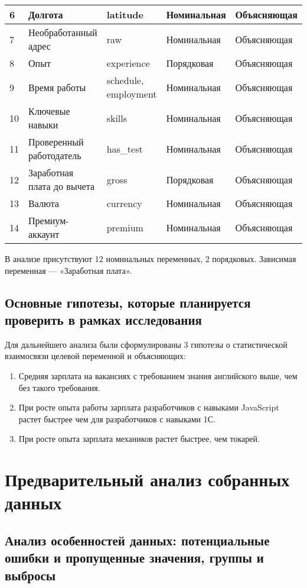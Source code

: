 \documentclass[12pt]{article}
\begin{document}
\begin{longtable}{|l|l|l|l|l|}
6 & Долгота & latitude  & Номинальная & Объясняющая\\ \hline
7 & Необработанный адрес & raw & Номинальная & Объясняющая\\ \hline
8 & Опыт & experience & Порядковая & Объясняющая\\ \hline
9 & Время работы & schedule, employment & Номинальная & Объясняющая\\ \hline
10 & Ключевые навыки & skills & Номинальная & Объясняющая\\ \hline
11 & Проверенный работодатель& has\_test & Номинальная & Объясняющая\\ \hline
12 & Заработная плата до вычета& gross & Порядковая & Объясняющая\\ \hline
13 & Валюта & currency & Номинальная & Объясняющая\\ \hline
14 & Премиум-аккаунт & premium & Номинальная & Объясняющая\\ \hline

\end{longtable}

В анализе присутствуют 12 номинальных переменных, 2 порядковых. Зависимая переменная --- «Заработная плата».
\subsection{Основные гипотезы, которые планируется проверить в рамках исследования}

Для дальнейшего анализа были сформулированы 3 гипотезы о статистической взаимосвязи целевой переменной и объясняющих:
\begin{enumerate}
\item Средняя зарплата на вакансиях с требованием знания английского выше, чем без такого требования. 
\item  При росте опыта работы зарплата разработчиков с навыками JavaScript растет быстрее чем для разработчиков с навыками 1С.
\item  При росте опыта зарплата механиков растет быстрее, чем токарей.
\end{enumerate}
\section{Предварительный анализ собранных данных}
\subsection{Анализ особенностей данных: потенциальные ошибки и пропущенные значения,
группы и выбросы}
\end{document}
